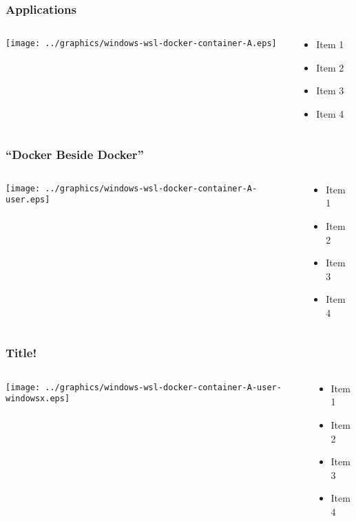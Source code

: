     \begin{frame}
      \frametitle{Applications}
      \begin{columns}
        \begin{column}{0.5\textwidth}
          \texttt{[image: ../graphics/windows-wsl-docker-container-A.eps]}
        \end{column}
        \begin{column}{0.5\textwidth}
          \begin{itemize}
          \item Item 1
          \item Item 2
          \item Item 3
          \item Item 4
          \end{itemize}
        \end{column}
      \end{columns}
    \end{frame}

    \begin{frame}
      \frametitle{``Docker Beside Docker''}
      \begin{columns}
        \begin{column}{0.5\textwidth}
          \texttt{[image: ../graphics/windows-wsl-docker-container-A-user.eps]}
        \end{column}
        \begin{column}{0.5\textwidth}
          \begin{itemize}
          \item Item 1
          \item Item 2
          \item Item 3
          \item Item 4
          \end{itemize}
        \end{column}
      \end{columns}
    \end{frame}

    \begin{frame}
      \frametitle{Title!}
      \begin{columns}
        \begin{column}{0.5\textwidth}
          \texttt{[image: ../graphics/windows-wsl-docker-container-A-user-windowsx.eps]}
        \end{column}
        \begin{column}{0.5\textwidth}
          \begin{itemize}
          \item Item 1
          \item Item 2
          \item Item 3
          \item Item 4
          \end{itemize}
        \end{column}
      \end{columns}
    \end{frame}

